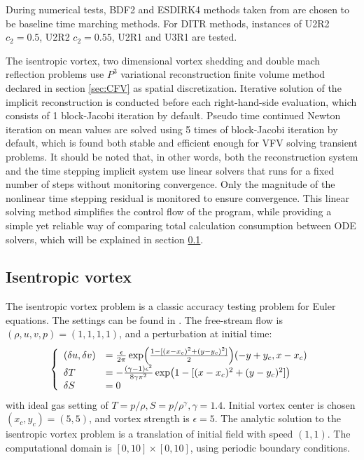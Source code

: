 During numerical tests,
BDF2 and ESDIRK4 methods taken from
\cite{bijl2002implicitBDFvESDIRK,kennedy2003additiveARK}
are chosen to be
baseline time marching methods.
For DITR methods, instances of
U2R2 $c_2 = 0.5$, U2R2 $c_2 = 0.55$, U2R1 and U3R1 are tested.

The isentropic vortex, two dimensional vortex shedding
and  double mach reflection problems use
$P^3$ variational reconstruction finite volume method declared in
section \ref{sec:CFV} as spatial  discretization.
Iterative solution of the implicit reconstruction
is conducted before each right-hand-side evaluation,
which consists of 1 block-Jacobi iteration by default.
Pseudo time continued Newton iteration on mean values are
solved using 5 times of block-Jacobi iteration by default,
which is found both stable and efficient enough for VFV solving
transient problems.
It should be noted that, in other words,
both the reconstruction system and
the time stepping implicit system use linear solvers that
runs for a fixed number of steps without monitoring convergence.
Only the magnitude of the nonlinear time stepping residual
is monitored to ensure convergence.
This linear solving method simplifies the control flow of
the program,
while providing a simple yet reliable way of
comparing total calculation consumption between ODE solvers,
which will be explained in section \ref{ssec:resultIV}.



\subsection{Isentropic vortex}
\label{ssec:resultIV}

The isentropic vortex problem is a classic
accuracy testing problem for Euler equations.
The settings can be found in \cite{hu1999weighted_WENO}.
The free-stream flow is $(\rho,u,v,p)=(1,1,1,1)$,
and a perturbation at initial time:
\begin{equation}
    \left\{
    \begin{array}[2]{ll}
        (\delta u, \delta v) & = \frac{\epsilon}{2\pi}\exp(\frac{1-[(x-x_c)^2+(y-y_c)^2]}{2})(-y+y_c,x-x_c) \\
        \delta T             & = - \frac{(\gamma-1)\epsilon^2}{8\gamma\pi^2}\exp(1-[(x-x_c)^2+(y-y_c)^2])   \\
        \delta S             & = 0                                                                          \\
    \end{array}
    \right.
\end{equation}
with ideal gas setting of $T = p/\rho, S= p/\rho^\gamma, \gamma =1.4$.
Initial vortex center is chosen $(x_c,y_c)=(5,5)$,
and vortex strength is $\epsilon = 5$.
The analytic solution to the isentropic vortex problem is a
translation of initial field with speed $(1,1)$.
The computational domain is $[0,10]\times[0,10]$,
using periodic boundary conditions.

